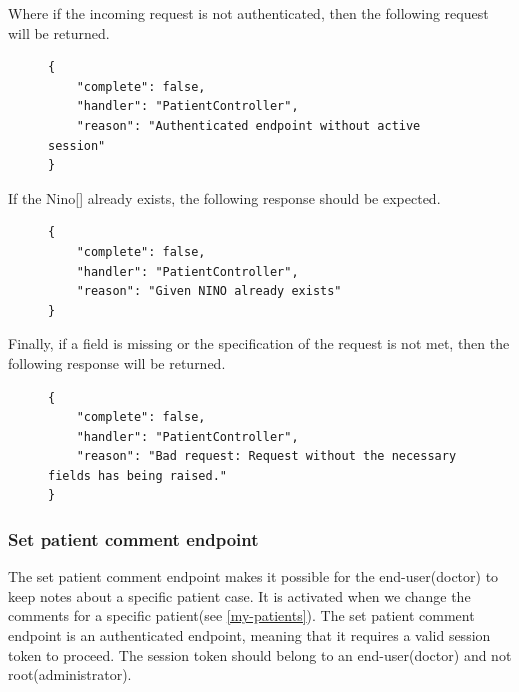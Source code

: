					Where if the incoming request is not authenticated, then the following request will be returned.
					\begin{figure}[H]
						\iftrue
						\begin{lstlisting}[]
{
	"complete": false,
	"handler": "PatientController",
	"reason": "Authenticated endpoint without active session"
}
						\end{lstlisting}
					\end{figure}
					If the Nino[\cite{nino-format}] already exists, the following response should be expected.
					\begin{figure}[H]
						\iftrue
						\begin{lstlisting}[]
{
	"complete": false,
	"handler": "PatientController",
	"reason": "Given NINO already exists"
}
						\end{lstlisting}
					\end{figure}
					Finally, if a field is missing or the specification of the request is not met, then the following response will be returned.
					\begin{figure}[H]
						\iftrue
						\begin{lstlisting}[]
{
	"complete": false,
	"handler": "PatientController",
	"reason": "Bad request: Request without the necessary fields has being raised."
}					
						\end{lstlisting}
					\end{figure}
				\subsubsection{Set patient comment endpoint}
				
				
					The set patient comment endpoint makes it possible for the end-user(doctor) to keep notes about a specific patient 
					case. It is activated when we change the comments for a specific patient(see \ref{my-patients}). The set patient  comment endpoint is 
					an authenticated endpoint, meaning that it requires a valid session token to proceed. The session token should 
					belong to an end-user(doctor) and not root(administrator).

